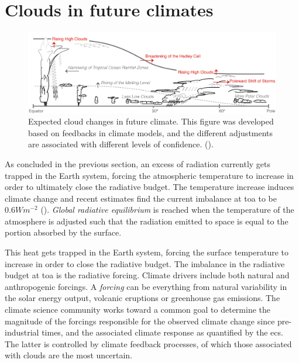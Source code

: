 \section{Clouds in future climates} \label{sec:intro_cloud_future_climates}
\begin{figure}[h]
    \centering
    \includegraphics[scale = 0.8]{Chapter1_Intro/images/Fig7-11_ipcc.jpg}
    \caption{Expected cloud changes in future climate. This figure was developed based on feedbacks in climate models, and the different adjustments are associated with different levels of confidence.  (\cite{IPCC_CH7_clouds}).}
    \label{fig:cloud_scheme}
\end{figure}
As concluded in the previous section, an excess of radiation currently gets trapped in the Earth system, forcing the atmospheric temperature to increase in order to ultimately close the radiative budget. The temperature increase induces climate change and recent estimates find the current imbalance at \acrshort{toa} to be $0.6 Wm^{-2}$ (\cite{Wild2019TheModels}).  \textit{Global radiative equilibrium} is reached when the temperature of the atmosphere is adjusted such that the radiation emitted to space is equal to the portion absorbed by the surface.


This heat gets trapped in the Earth system, forcing the surface temperature to increase in order to close the radiative budget. The imbalance in the radiative budget at \acrfull{toa} is the radiative forcing. 
Climate drivers include both natural and anthropogenic forcings. A \textit{forcing} can be everything from natural variability in the solar energy output, volcanic eruptions or greenhouse gas emissions. The climate science community works toward a common goal to determine the magnitude of the forcings responsible for the observed climate change since pre-industrial times, and the associated climate response as quantified by the \acrshort{ecs}. The latter is controlled by climate feedback processes, of which those associated with clouds are the most uncertain. %

